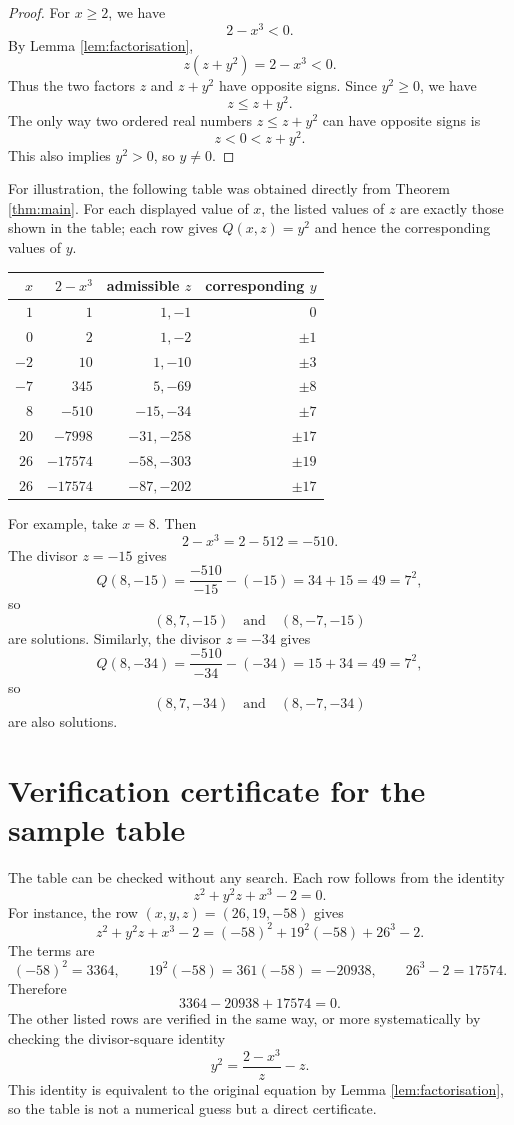 \documentclass[11pt,a4paper]{amsart}
\theoremstyle{definition}
\begin{document}
\begin{proof}
For $x\ge2$, we have
\[
        2-x^3<0.
\]
By Lemma \ref{lem:factorisation},
\[
        z(z+y^2)=2-x^3<0.
\]
Thus the two factors $z$ and $z+y^2$ have opposite signs. Since $y^2\ge0$, we have
\[
        z\le z+y^2.
\]
The only way two ordered real numbers $z\le z+y^2$ can have opposite signs is
\[
        z<0<z+y^2.
\]
This also implies $y^2>0$, so $y\ne0$.
\end{proof}

For illustration, the following table was obtained directly from Theorem \ref{thm:main}. For each displayed value of $x$, the listed values of $z$ are exactly those shown in the table; each row gives $Q(x,z)=y^2$ and hence the corresponding values of $y$.

\begin{center}
\begin{tabular}{rrrr}
\toprule
$x$ & $2-x^3$ & admissible $z$ & corresponding $y$ \\
\midrule
$1$ & $1$ & $1,-1$ & $0$ \\
$0$ & $2$ & $1,-2$ & $\pm1$ \\
$-2$ & $10$ & $1,-10$ & $\pm3$ \\
$-7$ & $345$ & $5,-69$ & $\pm8$ \\
$8$ & $-510$ & $-15,-34$ & $\pm7$ \\
$20$ & $-7998$ & $-31,-258$ & $\pm17$ \\
$26$ & $-17574$ & $-58,-303$ & $\pm19$ \\
$26$ & $-17574$ & $-87,-202$ & $\pm17$ \\
\bottomrule
\end{tabular}
\end{center}

For example, take $x=8$. Then
\[
        2-x^3=2-512=-510.
\]
The divisor $z=-15$ gives
\[
        Q(8,-15)=\frac{-510}{-15}-(-15)=34+15=49=7^2,
\]
so
\[
        (8,7,-15)
        \quad\text{and}\quad
        (8,-7,-15)
\]
are solutions. Similarly, the divisor $z=-34$ gives
\[
        Q(8,-34)=\frac{-510}{-34}-(-34)=15+34=49=7^2,
\]
so
\[
        (8,7,-34)
        \quad\text{and}\quad
        (8,-7,-34)
\]
are also solutions.

\section{Verification certificate for the sample table}

The table can be checked without any search. Each row follows from the identity
\[
        z^2+y^2z+x^3-2=0.
\]
For instance, the row $(x,y,z)=(26,19,-58)$ gives
\[
        z^2+y^2z+x^3-2
        =(-58)^2+19^2(-58)+26^3-2.
\]
The terms are
\[
        (-58)^2=3364,
        \qquad 19^2(-58)=361(-58)=-20938,
        \qquad 26^3-2=17574.
\]
Therefore
\[
        3364-20938+17574=0.
\]
The other listed rows are verified in the same way, or more systematically by checking the divisor-square identity
\[
        y^2=\frac{2-x^3}{z}-z.
\]
This identity is equivalent to the original equation by Lemma \ref{lem:factorisation}, so the table is not a numerical guess but a direct certificate.
\end{document}
